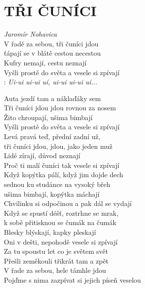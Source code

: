 \section*{\Huge TŘI ČUNÍCI}
\emph{Jaromír Nohavica}\\

V řadě za sebou, tři čuníci jdou\\
ťápají se v blátě cestou necestou\\
Kufry nemají, cestu neznají\\
Vyšli prostě do světa a vesele si zpívají\\

\textregistered: \emph{Ui-ui ui-ui uí, ui-ui ui-ui uí...}\\

\begin{Large}

Auta jezdí tam a náklaďáky sem\\
Tři čuníci jdou jdou rovnou za nosem\\
Žito chroupají, ušima bimbají\\
Vyšli prostě do světa a vesele si zpívají \hspace{0.5cm} \textregistered\\

Levá pravá teď, přední zadní už,\\
tři čuníci jdou, jdou, jako jeden muž\\
Lidé zírají, důvod neznají\\
Proč ti malí čuníci tak vesele si zpívají \hspace{0.5cm} \textregistered\\

Když kopýtka pálí, když jim dojde dech\\
sednou ku studánce na vysoký břeh\\
ušima bimbají, kopýtka máchají\\
Chvilinku si odpočinou a pak dál se vydají \hspace{0.5cm} \textregistered\\

Když se spustí déšť, roztrhne se mrak,\\
k sobě přitisknou se čumák na čumák\\
Blesky blýskají, kapky pleskají\\
Oni v dešti, nepohodě vesele si zpívají \hspace{0.5cm} \textregistered\\

Za tu spoustu let co je světem svět\\
Přešli zeměkouli třikrát tam a zpět\\
V řade za sebou, hele támhle jdou\\
Pojďme s nima zazpívat si jejich píseň veselou \hspace{0.5cm} \textregistered

\end{Large}

\newpage

